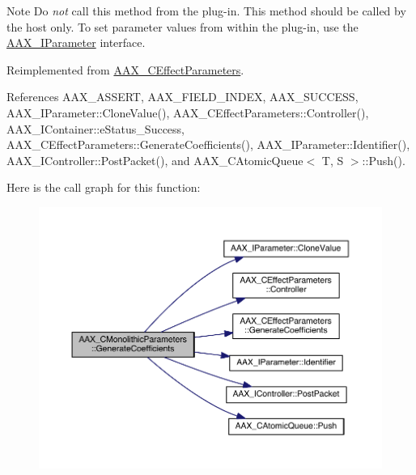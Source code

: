 \begin{DoxyNote}{Note}
Do {\itshape not} call this method from the plug-\/in. This method should be called by the host only. To set parameter values from within the plug-\/in, use the \hyperlink{a00108}{A\+A\+X\+\_\+\+I\+Parameter} interface. 
\end{DoxyNote}


Reimplemented from \hyperlink{a00018_a7f85327b464a4a7f9b66155f37961bf3}{A\+A\+X\+\_\+\+C\+Effect\+Parameters}.



References A\+A\+X\+\_\+\+A\+S\+S\+E\+R\+T, A\+A\+X\+\_\+\+F\+I\+E\+L\+D\+\_\+\+I\+N\+D\+E\+X, A\+A\+X\+\_\+\+S\+U\+C\+C\+E\+S\+S, A\+A\+X\+\_\+\+I\+Parameter\+::\+Clone\+Value(), A\+A\+X\+\_\+\+C\+Effect\+Parameters\+::\+Controller(), A\+A\+X\+\_\+\+I\+Container\+::e\+Status\+\_\+\+Success, A\+A\+X\+\_\+\+C\+Effect\+Parameters\+::\+Generate\+Coefficients(), A\+A\+X\+\_\+\+I\+Parameter\+::\+Identifier(), A\+A\+X\+\_\+\+I\+Controller\+::\+Post\+Packet(), and A\+A\+X\+\_\+\+C\+Atomic\+Queue$<$ T, S $>$\+::\+Push().



Here is the call graph for this function\+:
\nopagebreak
\begin{figure}[H]
\begin{center}
\leavevmode
\includegraphics[width=350pt]{a00026_ac9a3a7ac90562135ceb4b80301e12e92_cgraph}
\end{center}
\end{figure}


\hypertarget{a00026_a9b28c682b0495cf0d0eaa4c6c71e3f83}{}
